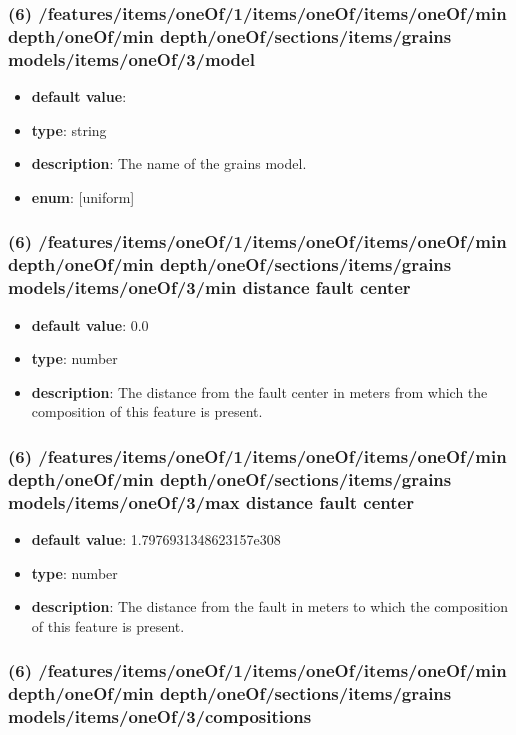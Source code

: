 \subsubsection{(6) /features/items/oneOf/1/items/oneOf/items/oneOf/min depth/oneOf/min depth/oneOf/sections/items/grains models/items/oneOf/3/model}
\begin{itemize}[leftmargin=6em]\item {\bf default value}: 
\item {\bf type}: string
\item {\bf description}: The name of the grains model.
\item {\bf enum}: [uniform]\end{itemize}\subsubsection{(6) /features/items/oneOf/1/items/oneOf/items/oneOf/min depth/oneOf/min depth/oneOf/sections/items/grains models/items/oneOf/3/min distance fault center}
\begin{itemize}[leftmargin=6em]\item {\bf default value}: 0.0
\item {\bf type}: number
\item {\bf description}: The distance from the fault center in meters from which the composition of this feature is present.
\end{itemize}\subsubsection{(6) /features/items/oneOf/1/items/oneOf/items/oneOf/min depth/oneOf/min depth/oneOf/sections/items/grains models/items/oneOf/3/max distance fault center}
\begin{itemize}[leftmargin=6em]\item {\bf default value}: 1.7976931348623157e308
\item {\bf type}: number
\item {\bf description}: The distance from the fault in meters to which the composition of this feature is present.
\end{itemize}\subsubsection{(6) /features/items/oneOf/1/items/oneOf/items/oneOf/min depth/oneOf/min depth/oneOf/sections/items/grains models/items/oneOf/3/compositions}
